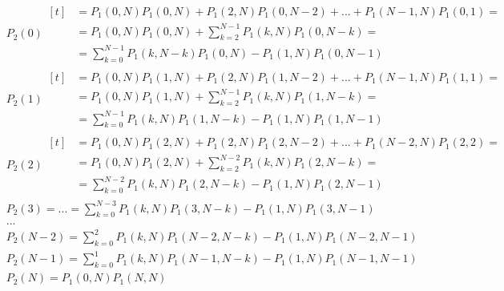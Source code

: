 \begin{align*}
    &P_{2}(0)
    	\begin{aligned}[t]
    		&= P_{1}(0, N)P_{1}(0, N) + P_{1}(2, N)P_{1}(0, N - 2) + ... + P_{1}(N-1, N)P_{1}(0, 1) = \\
			&= P_{1}(0, N)P_{1}(0, N) + \sum_{k=2}^{N-1}P_{1}(k, N)P_{1}(0, N-k) = \\
			&= \sum_{k=0}^{N-1}P_{1}(k, N-k)P_{1}(0, N) - P_{1}(1, N)P_{1}(0, N-1)
		\end{aligned}\\
	&P_{2}(1)
    	\begin{aligned}[t]
    		&= P_{1}(0, N)P_{1}(1, N) + P_{1}(2, N)P_{1}(1, N - 2) + ... + P_{1}(N-1, N)P_{1}(1, 1) = \\
			&= P_{1}(0, N)P_{1}(1, N) + \sum_{k=2}^{N-1}P_{1}(k, N)P_{1}(1, N-k) = \\
			&= \sum_{k=0}^{N-1}P_{1}(k, N)P_{1}(1, N - k) - P_{1}(1, N)P_{1}(1, N-1)
		\end{aligned}\\	
    &P_{2}(2)
    	\begin{aligned}[t]
    		&= P_{1}(0, N)P_{1}(2, N) + P_{1}(2, N)P_{1}(2, N - 2) + ... + P_{1}(N-2, N)P_{1}(2, 2) = \\
			&= P_{1}(0, N)P_{1}(2, N) + \sum_{k=2}^{N-2}P_{1}(k, N)P_{1}(2, N-k) = \\
			&= \sum_{k=0}^{N-2}P_{1}(k, N)P_{1}(2, N - k) - P_{1}(1, N)P_{1}(2, N-1)
		\end{aligned}\\	
	&P_{2}(3) = ... = \sum_{k=0}^{N-3}P_{1}(k, N)P_{1}(3, N - k) - P_{1}(1, N)P_{1}(3, N-1)\\
	&...\\
	&P_{2}(N-2) = \sum_{k=0}^{2}P_{1}(k, N)P_{1}(N-2, N - k) - P_{1}(1, N)P_{1}(N-2, N-1)\\
	&P_{2}(N-1) = \sum_{k=0}^{1}P_{1}(k, N)P_{1}(N-1, N - k) - P_{1}(1, N)P_{1}(N-1, N-1)\\
	&P_{2}(N) = P_{1}(0, N)P_{1}(N, N)
\end{align*}


